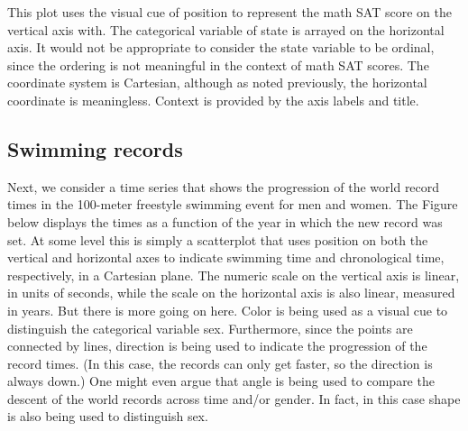 \documentclass[]{book}
\makeatletter
\newenvironment{Shaded}{\begin{snugshade}}{\end{snugshade}}
\newcommand{\KeywordTok}[1]{\textcolor[rgb]{0.13,0.29,0.53}{\textbf{#1}}}
\newcommand{\DataTypeTok}[1]{\textcolor[rgb]{0.13,0.29,0.53}{#1}}
\newcommand{\DecValTok}[1]{\textcolor[rgb]{0.00,0.00,0.81}{#1}}
\newcommand{\StringTok}[1]{\textcolor[rgb]{0.31,0.60,0.02}{#1}}
\newcommand{\OperatorTok}[1]{\textcolor[rgb]{0.81,0.36,0.00}{\textbf{#1}}}
\newcommand{\NormalTok}[1]{#1}
\newenvironment{kframe}{%
\medskip{}
\setlength{\fboxsep}{.8em}
 \def\at@end@of@kframe{}%
 \ifinner\ifhmode%
  \def\at@end@of@kframe{\end{minipage}}%
  \begin{minipage}{\columnwidth}%
 \fi\fi%
 \def\FrameCommand##1{\hskip\@totalleftmargin \hskip-\fboxsep
 \colorbox{shadecolor}{##1}\hskip-\fboxsep
     \hskip-\linewidth \hskip-\@totalleftmargin \hskip\columnwidth}%
 \MakeFramed {\advance\hsize-\width
   \@totalleftmargin\z@ \linewidth\hsize
   \@setminipage}}%
 {\par\unskip\endMakeFramed%
 \at@end@of@kframe}
\renewenvironment{Shaded}{\begin{kframe}}{\end{kframe}}
\theoremstyle{definition}
\theoremstyle{definition}
\theoremstyle{definition}
\theoremstyle{remark}
\makeatother
\begin{document}
This plot uses the visual cue of position to represent the math SAT
score on the vertical axis with. The categorical variable of state is
arrayed on the horizontal axis. It would not be appropriate to consider
the state variable to be ordinal, since the ordering is not meaningful
in the context of math SAT scores. The coordinate system is Cartesian,
although as noted previously, the horizontal coordinate is meaningless.
Context is provided by the axis labels and title.

\subsection{Swimming records}\label{swimming-records}

Next, we consider a time series that shows the progression of the world
record times in the 100-meter freestyle swimming event for men and
women. The Figure below displays the times as a function of the year in
which the new record was set. At some level this is simply a scatterplot
that uses position on both the vertical and horizontal axes to indicate
swimming time and chronological time, respectively, in a Cartesian
plane. The numeric scale on the vertical axis is linear, in units of
seconds, while the scale on the horizontal axis is also linear, measured
in years. But there is more going on here. Color is being used as a
visual cue to distinguish the categorical variable sex. Furthermore,
since the points are connected by lines, direction is being used to
indicate the progression of the record times. (In this case, the records
can only get faster, so the direction is always down.) One might even
argue that angle is being used to compare the descent of the world
records across time and/or gender. In fact, in this case shape is also
being used to distinguish sex.

\begin{Shaded}
\end{Shaded}
\end{document}

